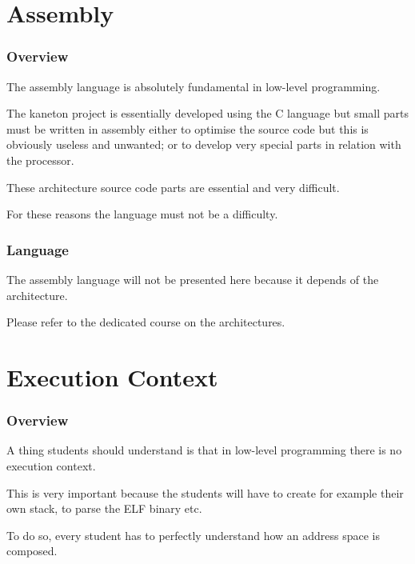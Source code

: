 %
%

\section{Assembly}


\begin{frame}
  \frametitle{Overview}

  The assembly language is absolutely fundamental in low-level programming.

  \-

  The kaneton project is essentially developed using the C language but
  small parts must be written in assembly either to optimise the source
  code but this is obviously useless and unwanted; or to develop very
  special parts in relation with the processor.

  \-

  These architecture source code parts are essential and very difficult.

  \-

  For these reasons the language must not be a difficulty.
\end{frame}


\begin{frame}
  \frametitle{Language}

  The assembly language will not be presented here because it depends
  of the architecture.

  \-

  Please refer to the dedicated course on the architectures.
\end{frame}

%
%

\section{Execution Context}


\begin{frame}
  \frametitle{Overview}

  A thing students should understand is that in low-level programming
  there is no execution context.

  \-

  This is very important because the students will have to create for
  example their own stack, to parse the ELF binary etc.

  \-

  To do so, every student has to perfectly understand how an address
  space is composed.
\end{frame}

